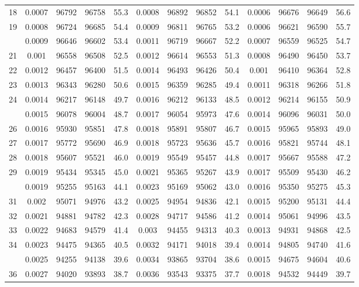 \documentclass[
  14pt,
]{article}
\begin{document}
\begin{longtable}[t]{lcccccccccccc}
18 & 0.0007 & 96792 & 96758 & 55.3 & 0.0008 & 96892 & 96852 & 54.1 & 0.0006 & 96676 & 96649 & 56.6\\
19 & 0.0008 & 96724 & 96685 & 54.4 & 0.0009 & 96811 & 96765 & 53.2 & 0.0006 & 96621 & 96590 & 55.7\\
\addlinespace
20 & 0.0009 & 96646 & 96602 & 53.4 & 0.0011 & 96719 & 96667 & 52.2 & 0.0007 & 96559 & 96525 & 54.7\\
21 & 0.001 & 96558 & 96508 & 52.5 & 0.0012 & 96614 & 96553 & 51.3 & 0.0008 & 96490 & 96450 & 53.7\\
22 & 0.0012 & 96457 & 96400 & 51.5 & 0.0014 & 96493 & 96426 & 50.4 & 0.001 & 96410 & 96364 & 52.8\\
23 & 0.0013 & 96343 & 96280 & 50.6 & 0.0015 & 96359 & 96285 & 49.4 & 0.0011 & 96318 & 96266 & 51.8\\
24 & 0.0014 & 96217 & 96148 & 49.7 & 0.0016 & 96212 & 96133 & 48.5 & 0.0012 & 96214 & 96155 & 50.9\\
\addlinespace
25 & 0.0015 & 96078 & 96004 & 48.7 & 0.0017 & 96054 & 95973 & 47.6 & 0.0014 & 96096 & 96031 & 50.0\\
26 & 0.0016 & 95930 & 95851 & 47.8 & 0.0018 & 95891 & 95807 & 46.7 & 0.0015 & 95965 & 95893 & 49.0\\
27 & 0.0017 & 95772 & 95690 & 46.9 & 0.0018 & 95723 & 95636 & 45.7 & 0.0016 & 95821 & 95744 & 48.1\\
28 & 0.0018 & 95607 & 95521 & 46.0 & 0.0019 & 95549 & 95457 & 44.8 & 0.0017 & 95667 & 95588 & 47.2\\
29 & 0.0019 & 95434 & 95345 & 45.0 & 0.0021 & 95365 & 95267 & 43.9 & 0.0017 & 95509 & 95430 & 46.2\\
\addlinespace
30 & 0.0019 & 95255 & 95163 & 44.1 & 0.0023 & 95169 & 95062 & 43.0 & 0.0016 & 95350 & 95275 & 45.3\\
31 & 0.002 & 95071 & 94976 & 43.2 & 0.0025 & 94954 & 94836 & 42.1 & 0.0015 & 95200 & 95131 & 44.4\\
32 & 0.0021 & 94881 & 94782 & 42.3 & 0.0028 & 94717 & 94586 & 41.2 & 0.0014 & 95061 & 94996 & 43.5\\
33 & 0.0022 & 94683 & 94579 & 41.4 & 0.003 & 94455 & 94313 & 40.3 & 0.0013 & 94931 & 94868 & 42.5\\
34 & 0.0023 & 94475 & 94365 & 40.5 & 0.0032 & 94171 & 94018 & 39.4 & 0.0014 & 94805 & 94740 & 41.6\\
\addlinespace
35 & 0.0025 & 94255 & 94138 & 39.6 & 0.0034 & 93865 & 93704 & 38.6 & 0.0015 & 94675 & 94604 & 40.6\\
36 & 0.0027 & 94020 & 93893 & 38.7 & 0.0036 & 93543 & 93375 & 37.7 & 0.0018 & 94532 & 94449 & 39.7\\

\end{longtable}
\end{document}
